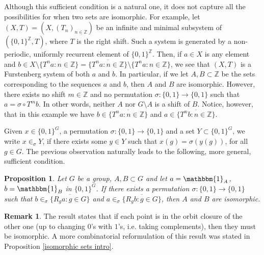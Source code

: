 \documentclass{amsart}
\numberwithin{equation}{section}
\newtheorem{proposition}[lemma]{Proposition}
\theoremstyle{definition}
\newtheorem*{remark*}{Remark}
\theoremstyle{plain}
\newcommand{\Z}{{\mathbb Z}}
\begin{document}
Although this sufficient condition is a natural one, it 
does not 
capture all the possibilities for when two sets are 
isomorphic. For
example, let $(X,T)=(X,(T_n)_{n\in\Z})$ be an infinite 
and minimal subsystem of $(\{0,1\}^{\Z},T)$, where $T$ is 
the right shift. Such a system is generated by a 
non-periodic, uniformly recurrent element of 
$\{0,1\}^{\Z}$. Then, if $a\in X$ is any element and 
$b\in X\setminus \{T^na:n\in \Z\}=\overline{\{T^na:n\in \Z\}}\setminus \{T^na:n\in \Z\}$, we see that $(X,T)$ 
is a Furstenberg system of both $a$ and $b$. In particular, if we let $A, B \subset \mathbb{Z}$ be the sets corresponding to the sequences $a$ and $b$, then $A$ and $B$ are isomorphic. However, there exists no shift 
$m \in \mathbb{Z}$ and no permutation 
$\sigma: \{0,1\} \to \{0,1\}$ such that $a = \sigma \circ T^m b$. In other words, neither $A$ nor $G \setminus A$ 
is a shift of $B$.  Notice, however, that in this example 
we have 
$b \in \overline{\{T^n a : n \in \mathbb{Z}\}}$ 
and 
$a \in \overline{\{T^n b : n \in \mathbb{Z}\}}$.


Given $x\in \{0,1\}^G$, a permutation $\sigma:\{0,1\}\to \{0,1\}$ and a set $Y\subset \{0,1\}^G$, we write $x\in_{\sigma} Y$, if there exists some $y\in Y$ such that $x(g)=\sigma(y(g))$, for all $g\in G$. 
The previous observation naturally leads to the 
following, more general, sufficient condition. 
\begin{proposition} \label{limit case of isomorphic systems sufficient}
Let $G$ be a group, $A,B\subset G$ and let $a=\mathbbm{1}_A$, $b=\mathbbm{1}_B$ in $\{0,1\}^G$. If there exists a
permutation $\sigma:\{0,1\}\to \{0,1\}$ such that 
$b\in_{\sigma} \overline{\{R_ga:g\in G\}}$ and 
$a\in_{\sigma} \overline{\{R_gb:g\in G\}}$, then $A$ 
and $B$ are isomorphic.     
\end{proposition}

\begin{remark*}
The result states that if each point is in the orbit 
closure of the other one (up to changing $0$'s with $1$'s, i.e. taking complements), then they must be isomorphic. A more combinatorial reformulation of this result was stated in Proposition \ref{isomorphic sets intro}.
\end{remark*}
\end{document}
